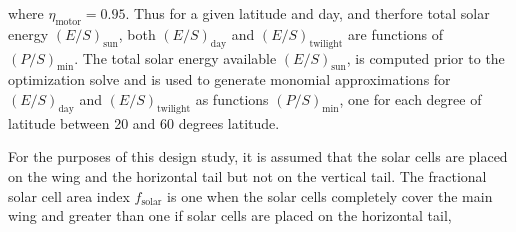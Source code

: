 where $\eta_{\text{motor}} = 0.95$. Thus for a given latitude and day, and therfore total solar energy $(E/S)_{\text{sun}}$, both $(E/S)_{\text{day}}$ and $(E/S)_{\text{twilight}}$ are functions of $(P/S)_{\text{min}}$.  
The total solar energy available $(E/S)_{\text{sun}}$, is computed prior to the optimization solve and is used to generate monomial approximations for $(E/S)_{\text{day}}$ and $(E/S)_{\text{twilight}}$ as functions $(P/S)_{\text{min}}$, one for each degree of latitude between 20 and 60 degrees latitude. 
\DIFdelbegin {}\DIFdelend %

\DIFdelbegin %
{%
\textbf{}%
}

\DIFdelend For the purposes of this design study, it is assumed that the solar cells are placed on the wing and the horizontal tail but not on the vertical tail. 
The fractional solar cell area index $f_{\text{solar}}$ is one when the solar cells completely cover the main wing and greater than one if solar cells are placed on the horizontal tail,

